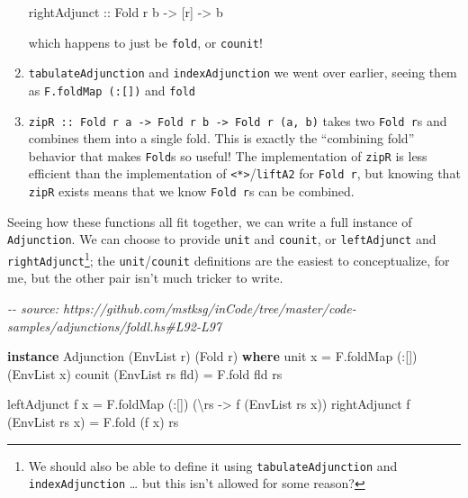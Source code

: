 \documentclass[]{article}
\newenvironment{Shaded}{}{}
\newcommand{\CommentTok}[1]{\textcolor[rgb]{0.38,0.63,0.69}{\textit{#1}}}
\newcommand{\DataTypeTok}[1]{\textcolor[rgb]{0.56,0.13,0.00}{#1}}
\newcommand{\KeywordTok}[1]{\textcolor[rgb]{0.00,0.44,0.13}{\textbf{#1}}}
\newcommand{\NormalTok}[1]{#1}
\newcommand{\OperatorTok}[1]{\textcolor[rgb]{0.40,0.40,0.40}{#1}}
\newcommand{\OtherTok}[1]{\textcolor[rgb]{0.00,0.44,0.13}{#1}}
\begin{document}
\begin{enumerate}
\begin{Shaded}
\begin{Highlighting}[]
\OtherTok{rightAdjunct\textquotesingle{} ::} \DataTypeTok{Fold}\NormalTok{ r b }\OtherTok{{-}\textgreater{}}\NormalTok{ [r] }\OtherTok{{-}\textgreater{}}\NormalTok{ b}
\end{Highlighting}
\end{Shaded}

  which happens to just be \texttt{fold}, or \texttt{counit}!
\item
  \texttt{tabulateAdjunction} and \texttt{indexAdjunction} we went over earlier,
  seeing them as \texttt{F.foldMap\ (:{[}{]})} and \texttt{fold}
\item
  \texttt{zipR\ ::\ Fold\ r\ a\ -\textgreater{}\ Fold\ r\ b\ -\textgreater{}\ Fold\ r\ (a,\ b)}
  takes two \texttt{Fold\ r}s and combines them into a single fold. This is
  exactly the ``combining fold'' behavior that makes \texttt{Fold}s so useful!
  The implementation of \texttt{zipR} is less efficient than the implementation
  of \texttt{\textless{}*\textgreater{}}/\texttt{liftA2} for \texttt{Fold\ r},
  but knowing that \texttt{zipR} exists means that we know \texttt{Fold\ r}s can
  be combined.
\end{enumerate}

Seeing how these functions all fit together, we can write a full instance of
\texttt{Adjunction}. We can choose to provide \texttt{unit} and \texttt{counit},
or \texttt{leftAdjunct} and \texttt{rightAdjunct}\footnote{We should also be
  able to define it using \texttt{tabulateAdjunction} and
  \texttt{indexAdjunction} \ldots{} but this isn't allowed for some reason?};
the \texttt{unit}/\texttt{counit} definitions are the easiest to conceptualize,
for me, but the other pair isn't much tricker to write.

\begin{Shaded}
\begin{Highlighting}[]
\CommentTok{{-}{-} source: https://github.com/mstksg/inCode/tree/master/code{-}samples/adjunctions/foldl.hs\#L92{-}L97}

\KeywordTok{instance} \DataTypeTok{Adjunction}\NormalTok{ (}\DataTypeTok{EnvList}\NormalTok{ r) (}\DataTypeTok{Fold}\NormalTok{ r) }\KeywordTok{where}
\NormalTok{    unit x }\OtherTok{=}\NormalTok{ F.foldMap (}\OperatorTok{:}\NormalTok{[]) (}\OtherTok{\textasciigrave{}EnvList\textasciigrave{}}\NormalTok{ x)}
\NormalTok{    counit (}\DataTypeTok{EnvList}\NormalTok{ rs fld) }\OtherTok{=}\NormalTok{ F.fold fld rs}

\NormalTok{    leftAdjunct f x }\OtherTok{=}\NormalTok{ F.foldMap (}\OperatorTok{:}\NormalTok{[]) (\textbackslash{}rs }\OtherTok{{-}\textgreater{}}\NormalTok{ f (}\DataTypeTok{EnvList}\NormalTok{ rs x))}
\NormalTok{    rightAdjunct f (}\DataTypeTok{EnvList}\NormalTok{ rs x) }\OtherTok{=}\NormalTok{ F.fold (f x) rs}
\end{Highlighting}
\end{Shaded}
\end{document}
